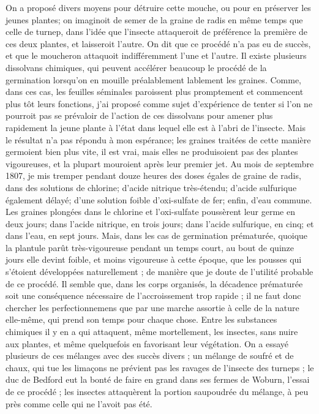 On a proposé divers moyens pour détruire cette mouche, ou pour en préserver les jeunes plantes; on imaginoit de semer de la graine de radis en même temps que celle de turnep, dans l'idée que l'insecte attaqueroit de préférence la première de ces deux plantes, et laisseroit l'autre. On dit que ce procédé n'a pas eu de succès, et que le moucheron attaquoit indifféremment l'une et l'autre.
Il existe plusieurs dissolvans chimiques, qui peuvent accélérer beaucoup le procédé de la germination lorsqu'on en mouille préalablement\setcounter{page}{19} lablement les graines. Comme, dans ces cas, les feuilles séminales paroissent plus promptement et commencent plus tôt leurs fonctions, j'ai proposé comme sujet d'expérience de tenter si l'on ne pourroit pas se prévaloir de l'action de ces dissolvans pour amener plus rapidement la jeune plante à l'état dans lequel elle est à l'abri de l'insecte. Mais le résultat n'a pas répondu à mon espérance; les graines traitées de cette manière germoient bien plus vite, il est vrai, mais elles ne produisoient pas des plantes vigoureuses, et la plupart mouroient après leur premier jet. Au mois de septembre 1807, je mis tremper pendant douze heures des doses égales de graine de radis, dans des solutions de chlorine; d'acide nitrique très-étendu; d'acide sulfurique également délayé; d'une solution foible d'oxi-sulfate de fer; enfin, d'eau commune. Les graines plongées dans le chlorine et l'oxi-sulfate poussèrent leur germe en deux jours; dans l'acide nitrique, en trois jours; dans l'acide sulfurique, en cinq; et dans l'eau, en sept jours. Mais, dans les cas de germination prématurée, quoique la plantule parût très-vigoureuse pendant un temps court, au bout de quinze jours elle devint foible, et moins vigoureuse à cette époque, que les pousses qui s'étoient développées\setcounter{page}{20} naturellement ; de manière que je doute de l’utilité probable de ce procédé. Il semble que, dans les corps organisés, la décadence prématurée soit une conséquence nécessaire de l’accroissement trop rapide ; il ne faut donc chercher les perfectionnemens que par une marche assortie à celle de la nature elle-même, qui prend son temps pour chaque chose.
Entre les substances chimiques il y en a qui attaquent, même mortellement, les insectes, sans nuire aux plantes, et même quelquefois en favorisant leur végétation. On a essayé plusieurs de ces mélanges avec des succès divers ; un mélange de soufré et de chaux, qui tue les limaçons ne prévient pas les ravages de l’insecte des turneps ; le duc de Bedford eut la bonté de faire en grand dans ses fermes de Woburn, l’essai de ce procédé ; les insectes attaquèrent la portion saupoudrée du mélange, à peu près comme celle qui ne l’avoit pas été.
